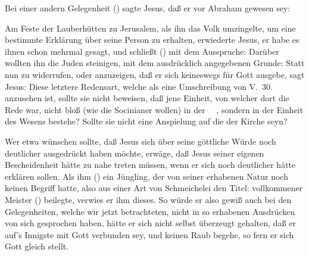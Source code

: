 \begin{aufza}
\item Bei einer andern Gelegenheit () sagte Jesus, daß er vor Abraham gewesen sey: 
\item Am Feste der Lauberhütten zu Jerusalem, als ihn das Volk umzingelte, um eine bestimmte Erklärung über seine Person zu erhalten, erwiederte Jesus, er habe es ihnen schon mehrmal gesagt, und schließt () mit dem Ausspruche:  Darüber wollten ihn die Juden steinigen, mit dem ausdrücklich angegebenen Grunde:  Statt nun zu widerrufen, oder anzuzeigen, daß er sich keineswegs für Gott ausgebe, sagt Jesus:  Diese letztere Redensart, welche als eine Umschreibung von V.~30. anzusehen ist, sollte sie nicht beweisen, daß jene Einheit, von welcher dort die Rede war, nicht bloß (wie die Socinianer wollen) in der ~\ , sondern in der Einheit des Wesens bestehe? Sollte sie nicht eine Anspielung auf die  der Kirche seyn?
\end{aufza}

\begin{RWanm} 
Wer etwa wünschen sollte, daß Jesus sich über seine göttliche Würde noch deutlicher ausgedrückt haben möchte, erwäge, daß Jesus seiner eigenen Bescheidenheit hätte zu nahe treten müssen, wenn er sich noch deutlicher hätte erklären sollen. Als ihm () ein Jüngling, der von seiner erhabenen Natur noch keinen Begriff hatte, also aus einer Art von Schmeichelei den Titel: vollkommener Meister () 
beilegte, verwies er ihm dieses. So würde er also gewiß auch bei den Gelegenheiten, welche wir jetzt betrachteten, nicht in so erhabenen Ausdrücken von sich gesprochen haben, hätte er sich nicht selbst überzeugt gehalten, daß er auf's Innigste mit Gott verbunden sey, und keinen Raub begehe, so fern er sich Gott gleich stellt. 
\end{RWanm}\par

